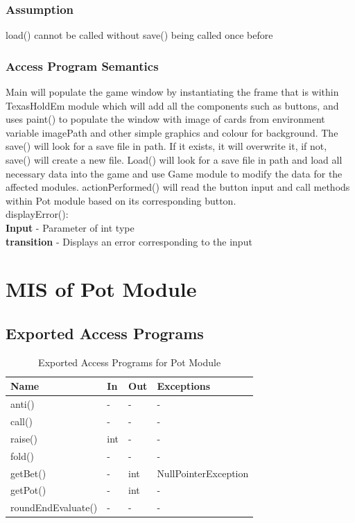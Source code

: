 \documentclass[11pt]{article}
\begin{document}
    \subsubsection{Assumption}
    load() cannot be called without save() being called once before
    \subsubsection{Access Program Semantics}
    Main will populate the game window by instantiating the frame that is within TexasHoldEm module which will add all the components such as buttons, and uses paint() to populate the window with image of cards from environment variable imagePath and other simple graphics and colour for background. The save() will look for a save file in path. If it exists, it will overwrite it, if not, save() will create a new file. Load() will look for a save file in path and load all necessary data into the game and use Game module to modify the data for the affected modules. actionPerformed() will read the button input and call methods within Pot module based on its corresponding button. \\
    displayError():\\
    \textbf{Input} - Parameter of int type\\
    \textbf{transition} - Displays an error corresponding to the input  
    \newline
     \section{MIS of Pot Module}
     
    \subsection{Exported Access Programs}
    \begin{table}[h]
    \caption{Exported Access Programs for Pot Module}
    \begin{tabular}{p{4cm}p{2cm}p{2cm}p{4cm}}
    Name & In & Out & Exceptions\\
    \hline
    anti() & - & - & -\\
    \hline
    call() & - & - & -\\
    \hline
    raise() & int & - & -\\
    \hline
    fold() & - & - & - \\
    \hline
    getBet() & - & int & NullPointerException\\
    \hline
    getPot() & - & int & -\\
    \hline
    roundEndEvaluate() & - & - & - \\
    \hline
    \end{tabular}
    \end{table}
\end{document}
